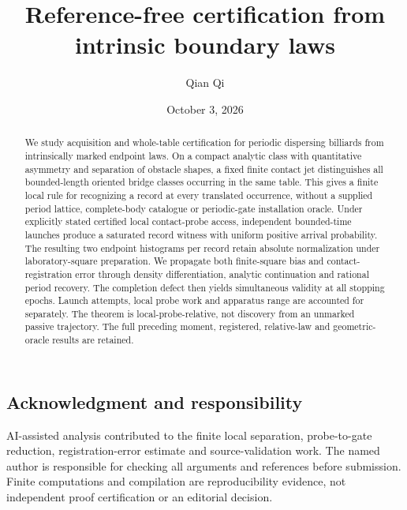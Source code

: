 \documentclass[11pt]{amsart}
\title[Reference-free certification]{Reference-free certification from intrinsic boundary laws}
\author{Qian Qi}\date{October 3, 2026}
\theoremstyle{definition}\newtheorem{definition}[theorem]{Definition}
\theoremstyle{remark}\newtheorem{remark}[theorem]{Remark}
\numberwithin{equation}{section}
\begin{document}
\begin{abstract}
We study acquisition and whole-table certification for periodic dispersing
billiards from intrinsically marked endpoint laws. On a compact analytic
class with quantitative asymmetry and separation of obstacle shapes, a
fixed finite contact jet distinguishes all bounded-length oriented bridge
classes occurring in the same table. This gives a finite local rule for
recognizing a record at every translated occurrence, without a supplied
period lattice, complete-body catalogue or periodic-gate installation
oracle. Under explicitly stated certified local contact-probe access,
independent bounded-time launches produce a saturated record witness with
uniform positive arrival probability. The resulting two endpoint
histograms per record retain absolute normalization under laboratory-square
preparation. We propagate both finite-square bias and contact-registration
error through density differentiation, analytic continuation and rational
period recovery. The completion defect then yields simultaneous validity
at all stopping epochs. Launch attempts, local probe work and apparatus
range are accounted for separately. The theorem is local-probe-relative,
not discovery from an unmarked passive trajectory. The full preceding
moment, registered, relative-law and geometric-oracle results are retained.
\end{abstract}
\maketitle






\subsection*{Acknowledgment and responsibility}
AI-assisted analysis contributed to the finite local separation,
probe-to-gate reduction, registration-error estimate and source-validation
work. The named author is responsible for checking all arguments and
references before submission. Finite computations and compilation are
reproducibility evidence, not independent proof certification or an
editorial decision.
\clearpage

\end{document}
